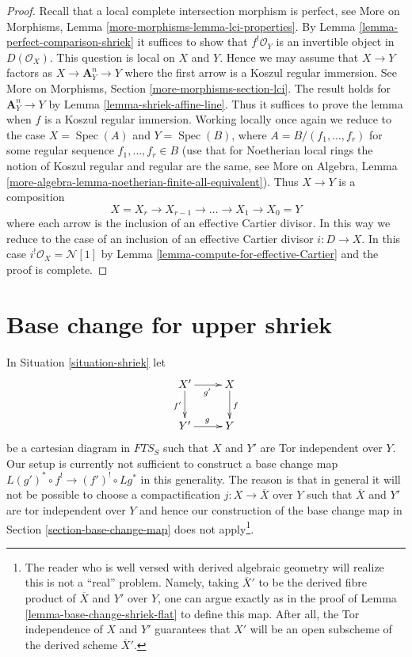 \documentclass{stacks-project}
\theoremstyle{plain}
\theoremstyle{definition}
\theoremstyle{remark}
\numberwithin{equation}{subsection}
\def\Spec{\mathop{\mathrm{Spec}}}
\begin{document}
\begin{proof}
Recall that a local complete intersection morphism is perfect, see
More on Morphisms, Lemma \ref{more-morphisms-lemma-lci-properties}.
By Lemma \ref{lemma-perfect-comparison-shriek} it suffices to show
that $f^!\mathcal{O}_Y$ is an invertible object in $D(\mathcal{O}_X)$.
This question is local on $X$ and $Y$. Hence we may assume that $X \to Y$
factors as $X \to \mathbf{A}^n_Y \to Y$ where the first arrow is a
Koszul regular immersion. See More on Morphisms, Section
\ref{more-morphisms-section-lci}.
The result holds for $\mathbf{A}^n_Y \to Y$
by Lemma \ref{lemma-shriek-affine-line}. Thus it suffices to prove
the lemma when $f$ is a Koszul regular immersion.
Working locally once again we reduce to the case
$X = \Spec(A)$ and $Y = \Spec(B)$, where $A = B/(f_1, \ldots, f_r)$
for some regular sequence $f_1, \ldots, f_r \in B$
(use that for Noetherian local rings the notion of Koszul
regular and regular are the same, see
More on Algebra, Lemma
\ref{more-algebra-lemma-noetherian-finite-all-equivalent}).
Thus $X \to Y$ is a composition
$$
X = X_r \to X_{r - 1} \to \ldots \to X_1 \to X_0 = Y
$$
where each arrow is the inclusion of an effective Cartier divisor.
In this way we reduce to the case of an inclusion of an effective
Cartier divisor $i : D \to X$. In this case
$i^!\mathcal{O}_X = \mathcal{N}[1]$ by
Lemma \ref{lemma-compute-for-effective-Cartier} and the proof is complete.
\end{proof}







\section{Base change for upper shriek}
\label{section-base-change-shriek}

\noindent
In Situation \ref{situation-shriek} let
$$
\xymatrix{
X' \ar[r]_{g'} \ar[d]_{f'} & X \ar[d]^f \\
Y' \ar[r]^g & Y
}
$$
be a cartesian diagram in $\textit{FTS}_S$ such that
$X$ and $Y'$ are Tor independent over $Y$. Our setup is currently
not sufficient to construct a base change map
$L(g')^* \circ f^! \to (f')^! \circ Lg^*$ in this generality.
The reason is that in general it will not be possible to choose
a compactification $j : X \to \overline{X}$ over $Y$ such that
$\overline{X}$ and $Y'$ are tor independent over $Y$ and hence
our construction of the base change map in
Section \ref{section-base-change-map} does not apply\footnote{
The reader who is well versed with derived algebraic geometry
will realize this is not a ``real'' problem. Namely, taking
$\overline{X}'$ to be the derived fibre product of
$\overline{X}$ and $Y'$ over $Y$, one can argue exactly as in
the proof of Lemma \ref{lemma-base-change-shriek-flat}
to define this map. After all, the Tor independence
of $X$ and $Y'$ guarantees that $X'$ will be an open subscheme
of the derived scheme $\overline{X}'$.}.
\end{document}

